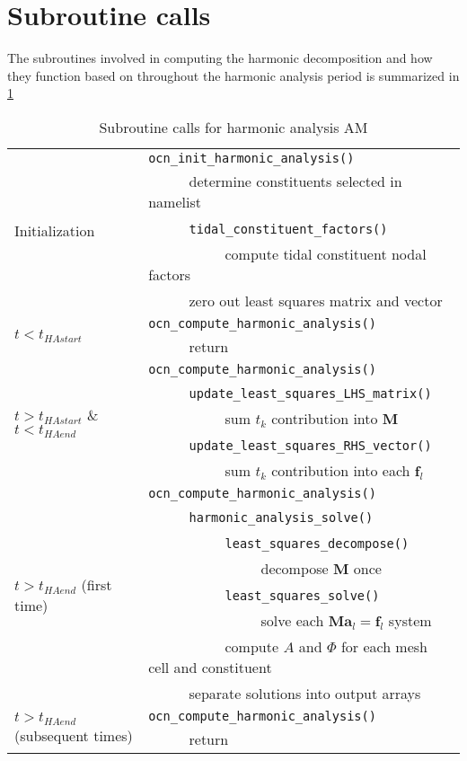 \documentclass[11pt]{report}
\begin{document}
\section{Subroutine calls}
The subroutines involved in computing the harmonic decomposition and how they function based on throughout the harmonic analysis period is summarized in \ref{tab:subroutines}
\begin{table}[ht]
\caption{Subroutine calls for harmonic analysis AM}
\begin{center}
\begin{tabular}{ll}
    \hline
    \multirow{5}{*}{Initialization} &  {\tt ocn\_init\_harmonic\_analysis()} \\
    &~~~~~ determine constituents selected in namelist \\
    &~~~~~ {\tt tidal\_constituent\_factors()} \\
    &~~~~~~~~~~ compute tidal constituent nodal factors \\
    &~~~~~ zero out least squares matrix and vector \\ \cline{2-2}
    \multirow{2}{*}{$t < t_{HAstart}$} & {\tt ocn\_compute\_harmonic\_analysis()} \\
    &~~~~~ return \\ \cline{2-2}
    \multirow{5}{*}{$t > t_{HAstart}$ \& $t < t_{HAend}$} & {\tt ocn\_compute\_harmonic\_analysis()} \\
    &~~~~~ {\tt update\_least\_squares\_LHS\_matrix()} \\
    &~~~~~~~~~~ sum $t_k$ contribution into $\mathbf{M}$ \\
    &~~~~~ {\tt update\_least\_squares\_RHS\_vector()} \\
    &~~~~~~~~~~ sum $t_k$ contribution into each $\mathbf{f}_l$\\ \cline{2-2}
    \multirow{8}{*}{$t > t_{HAend}$ (first time)} & {\tt ocn\_compute\_harmonic\_analysis()} \\
    &~~~~~ {\tt harmonic\_analysis\_solve()}\\ 
    &~~~~~~~~~~ {\tt least\_squares\_decompose()}\\
    &~~~~~~~~~~~~~~~ decompose $\mathbf{M}$ once\\
    &~~~~~~~~~~ {\tt least\_squares\_solve()}\\
    &~~~~~~~~~~~~~~~ solve each $\mathbf{M}\mathbf{a}_l=\mathbf{f}_l$ system\\
    &~~~~~~~~~~ compute $A$ and $\Phi$ for each mesh cell and constituent\\
    &~~~~~ separate solutions into output arrays \\ \cline{2-2}
    \multirow{2}{*}{$t > t_{HAend}$ (subsequent times)} & {\tt ocn\_compute\_harmonic\_analysis()} \\
    &~~~~~ return \\
    \hline
\end{tabular}
\end{center}
\label{tab:subroutines}
\end{table}
\end{document}
